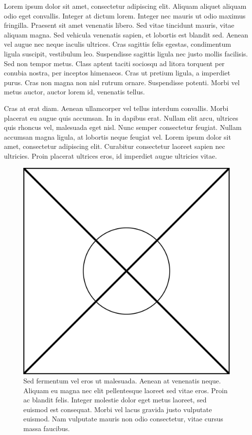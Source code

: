 Lorem ipsum dolor sit amet, consectetur adipiscing elit. Aliquam aliquet
aliquam odio eget convallis. Integer at dictum lorem. Integer nec mauris ut
odio maximus fringilla. Praesent sit amet venenatis libero. Sed vitae
tincidunt mauris, vitae aliquam magna. Sed vehicula venenatis sapien, et
lobortis est blandit sed. Aenean vel augue nec neque iaculis ultrices. Cras
sagittis felis egestas, condimentum ligula suscipit, vestibulum leo.
Suspendisse sagittis ligula nec justo mollis facilisis. Sed non tempor
metus. Class aptent taciti sociosqu ad litora torquent per conubia nostra,
per inceptos himenaeos. Cras ut pretium ligula, a imperdiet purus. Cras non
magna non nisl rutrum ornare. Suspendisse potenti. Morbi vel metus auctor,
auctor lorem id, venenatis tellus.

Cras at erat diam. Aenean ullamcorper vel tellus interdum convallis. Morbi
placerat eu augue quis accumsan. In in dapibus erat. Nullam elit arcu,
ultrices quis rhoncus vel, malesuada eget nisl. Nunc semper consectetur
feugiat. Nullam accumsan magna ligula, at lobortis neque feugiat vel. Lorem
ipsum dolor sit amet, consectetur adipiscing elit. Curabitur consectetur
laoreet sapien nec ultricies. Proin placerat ultrices eros, id imperdiet
augue ultricies vitae.

\begin{figure}
\centering
\includegraphics[width=\linewidth]{figures/figure1}
\caption{Sed fermentum vel eros ut malesuada. Aenean at venenatis neque.
  Aliquam eu magna nec elit pellentesque laoreet sed vitae eros.  Proin ac
  blandit felis. Integer molestie dolor eget metus laoreet, sed euismod est
  consequat. Morbi vel lacus gravida justo vulputate euismod. Nam vulputate
  mauris non odio consectetur, vitae cursus massa faucibus.}
\label{fig:function1}
\end{figure}

